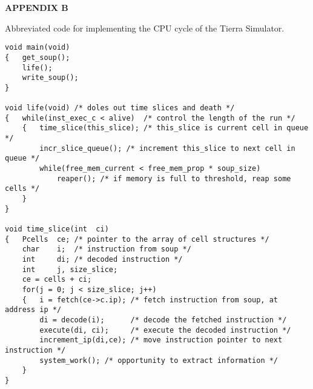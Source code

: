 \LP
\bf APPENDIX B\rm
\eLP

Abbreviated code for implementing the CPU cycle of the Tierra Simulator.

\begin{verbatim}
void main(void)
{   get_soup();
    life();
    write_soup();
}

void life(void) /* doles out time slices and death */
{   while(inst_exec_c < alive)  /* control the length of the run */
    {   time_slice(this_slice); /* this_slice is current cell in queue */
        incr_slice_queue(); /* increment this_slice to next cell in queue */
        while(free_mem_current < free_mem_prop * soup_size)
            reaper(); /* if memory is full to threshold, reap some cells */
    }
}

void time_slice(int  ci)
{   Pcells  ce; /* pointer to the array of cell structures */
    char    i;  /* instruction from soup */
    int     di; /* decoded instruction */
    int     j, size_slice;
    ce = cells + ci;
    for(j = 0; j < size_slice; j++)
    {   i = fetch(ce->c.ip); /* fetch instruction from soup, at address ip */
        di = decode(i);      /* decode the fetched instruction */
        execute(di, ci);     /* execute the decoded instruction */
        increment_ip(di,ce); /* move instruction pointer to next instruction */
        system_work(); /* opportunity to extract information */
    }
}


\end{verbatim}
